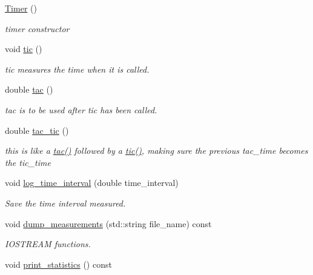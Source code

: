 \begin{DoxyCompactItemize}
\item 
\hyperlink{classreal__time__tools_1_1Timer_a572f7022db18de269ba08b31b05b4af7}{Timer} ()\hypertarget{classreal__time__tools_1_1Timer_a572f7022db18de269ba08b31b05b4af7}{}\label{classreal__time__tools_1_1Timer_a572f7022db18de269ba08b31b05b4af7}

\begin{DoxyCompactList}\small\item\em timer constructor \end{DoxyCompactList}\item 
void \hyperlink{classreal__time__tools_1_1Timer_a540f7f6925768c6f333b2fef4a914374}{tic} ()
\begin{DoxyCompactList}\small\item\em tic measures the time when it is called. \end{DoxyCompactList}\item 
double \hyperlink{classreal__time__tools_1_1Timer_a3d55794492714544c5c83aed23d8f1f9}{tac} ()
\begin{DoxyCompactList}\small\item\em tac is to be used after tic has been called. \end{DoxyCompactList}\item 
double \hyperlink{classreal__time__tools_1_1Timer_a310fc3b9165c3751a36ff92586f0facd}{tac\+\_\+tic} ()\hypertarget{classreal__time__tools_1_1Timer_a310fc3b9165c3751a36ff92586f0facd}{}\label{classreal__time__tools_1_1Timer_a310fc3b9165c3751a36ff92586f0facd}

\begin{DoxyCompactList}\small\item\em this is like a \hyperlink{classreal__time__tools_1_1Timer_a3d55794492714544c5c83aed23d8f1f9}{tac()} followed by a \hyperlink{classreal__time__tools_1_1Timer_a540f7f6925768c6f333b2fef4a914374}{tic()}, making sure the previous tac\+\_\+time becomes the tic\+\_\+time \end{DoxyCompactList}\item 
void \hyperlink{classreal__time__tools_1_1Timer_a14bd35142437b42533b1b478ce044c8f}{log\+\_\+time\+\_\+interval} (double time\+\_\+interval)
\begin{DoxyCompactList}\small\item\em Save the time interval measured. \end{DoxyCompactList}\item 
void \hyperlink{classreal__time__tools_1_1Timer_a1a20b4d7dcb04af92769857396408e54}{dump\+\_\+measurements} (std\+::string file\+\_\+name) const 
\begin{DoxyCompactList}\small\item\em I\+O\+S\+T\+R\+E\+AM functions. \end{DoxyCompactList}\item 
void \hyperlink{classreal__time__tools_1_1Timer_a71a7ad376bbc8cf60cfb839fefe6f805}{print\+\_\+statistics} () const \hypertarget{classreal__time__tools_1_1Timer_a71a7ad376bbc8cf60cfb839fefe6f805}{}\label{classreal__time__tools_1_1Timer_a71a7ad376bbc8cf60cfb839fefe6f805}


\end{DoxyCompactItemize}
